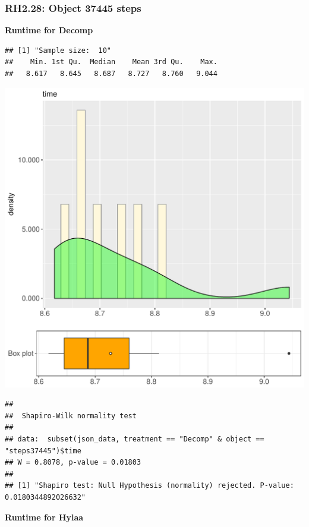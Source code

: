 \documentclass{article}\usepackage[]{graphicx}\usepackage[]{color}
\makeatletter
\def\maxwidth{ %
  \ifdim\Gin@nat@width>\linewidth
    \linewidth
  \else
    \Gin@nat@width
  \fi
}
\newenvironment{kframe}{%
 \def\at@end@of@kframe{}%
 \ifinner\ifhmode%
  \def\at@end@of@kframe{\end{minipage}}%
  \begin{minipage}{\columnwidth}%
 \fi\fi%
 \def\FrameCommand##1{\hskip\@totalleftmargin \hskip-\fboxsep
 \colorbox{shadecolor}{##1}\hskip-\fboxsep
     \hskip-\linewidth \hskip-\@totalleftmargin \hskip\columnwidth}%
 \MakeFramed {\advance\hsize-\width
   \@totalleftmargin\z@ \linewidth\hsize
   \@setminipage}}%
 {\par\unskip\endMakeFramed%
 \at@end@of@kframe}
\newenvironment{knitrout}{}{} %
\makeatother
\begin{document}
\subsubsection{RH2.28: Object 37445 steps}

 \textbf{Runtime for Decomp}
\begin{knitrout}
\color{fgcolor}\begin{kframe}
\begin{verbatim}
## [1] "Sample size:  10"
##    Min. 1st Qu.  Median    Mean 3rd Qu.    Max. 
##   8.617   8.645   8.687   8.727   8.760   9.044
\end{verbatim}
\end{kframe}
\includegraphics[width=\maxwidth]{figure/RH2_Decomp_steps37445-1} 
\begin{kframe}\begin{verbatim}
## 
## 	Shapiro-Wilk normality test
## 
## data:  subset(json_data, treatment == "Decomp" & object == "steps37445")$time
## W = 0.8078, p-value = 0.01803
## 
## [1] "Shapiro test: Null Hypothesis (normality) rejected. P-value: 0.0180344892026632"
\end{verbatim}
\end{kframe}
\end{knitrout}
 \textbf{Runtime for Hylaa}
\end{document}
